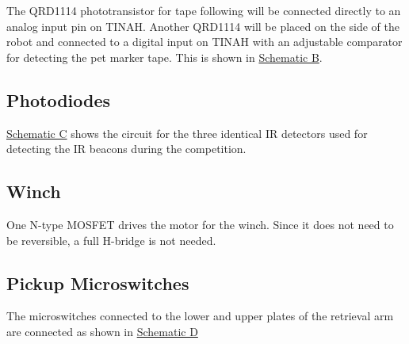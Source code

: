 \documentclass[11pt, oneside]{article} %
\begin{document}
	The QRD1114 phototransistor for tape following will be connected directly to an analog input pin on TINAH. Another QRD1114 will be placed on the side of the robot and connected to a digital input on TINAH with an adjustable comparator for detecting the pet marker tape. This is shown in \hyperref[sch:B]{Schematic B}.
	
	\subsection{Photodiodes}
	
	\hyperref[sch:C]{Schematic C} shows the circuit for the three identical IR detectors used for detecting the IR beacons during the competition.
	
	\subsection{Winch}
	
	One N-type MOSFET drives the motor for the winch. Since it does not need to be reversible, a full H-bridge is not needed.
	
	\subsection{Pickup Microswitches}
	
	The microswitches connected to the lower and upper plates of the retrieval arm are connected as shown in \hyperref[sch:E]{Schematic D}
	
\end{document}
